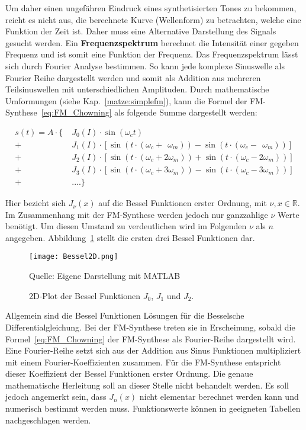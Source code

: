 Um daher einen ungefähren Eindruck eines synthetisierten Tones zu bekommen, reicht es nicht aus, die berechnete Kurve (Wellenform) zu betrachten, welche eine Funktion der Zeit ist. Daher muss eine Alternative Darstellung des Signals gesucht werden. Ein \textbf{Frequenzspektrum} berechnet die Intensität einer gegeben Frequenz und ist somit eine Funktion der Frequenz. Das Frequenzspektrum lässt sich durch Fourier Analyse bestimmen. So kann jede komplexe Sinuswelle als Fourier Reihe dargestellt werden und somit als Addition aus mehreren Teilsinuswellen mit unterschiedlichen Amplituden. \cite[S. 33]{raichel} Durch mathematische Umformungen (siehe Kap.~\ref{matze:simplefm}), kann die Formel der FM-Synthese~\ref{eq:FM_Chowning} als folgende Summe dargestellt werden: \cite{chowningPaper}

\begin{equation}
\begin{split}
s(t)=A\cdot \{\; & J_0(I)\cdot\sin(\omega_c t)  \\
         +&J_1(I)\cdot [\sin(t\cdot (\omega_c + \;\,\omega_m))-\sin(t\cdot (\omega_c-\;\,\omega_m))] \\
         +&J_2(I)\cdot [\sin(t\cdot (\omega_c + 2\omega_m))+\sin(t\cdot (\omega_c-2\omega_m))] \\
         +&J_3(I)\cdot [\sin(t\cdot (\omega_c + 3\omega_m))-\sin(t\cdot (\omega_c-3\omega_m))] \\
         +&....\}
\end{split}
\label{eq:chowningAddition}
\end{equation}

Hier bezieht sich $J_\nu(x)$ auf die Bessel Funktionen erster Ordnung, mit $\nu,x \in \mathbb{R}$. \cite[S. 223]{temme} Im Zusammenhang mit der FM-Synthese werden jedoch nur ganzzahlige $\nu$ Werte benötigt. Um diesen Umstand zu verdeutlichen wird im Folgenden $\nu$ als $n$ angegeben. Abbildung~\ref{fig:bessel2D} stellt die ersten drei Bessel Funktionen dar.

\begin{figure} [ht]
\centering
  \texttt{[image: Bessel2D.png]}
\caption{2D-Plot der Bessel Funktionen $J_0$, $J_1$ und $J_2$.}
\label{fig:bessel2D}
Quelle: Eigene Darstellung mit MATLAB
\end{figure}

\FloatBarrier


Allgemein sind die Bessel Funktionen Lösungen für die Besselsche Differentialgleichung.\cite[S. 220]{temme} Bei der FM-Synthese treten sie in Erscheinung, sobald die Formel~\ref{eq:FM_Chowning} der FM-Synthese als Fourier-Reihe dargestellt wird. Eine Fourier-Reihe setzt sich aus der Addition aus Sinus Funktionen multipliziert mit einem Fourier-Koeffizienten zusammen. Für die FM-Synthese entspricht dieser Koeffizient der Bessel Funktionen erster Ordnung. \cite[S. 221]{lathi} Die genaue mathematische Herleitung soll an dieser Stelle nicht behandelt werden. Es soll jedoch angemerkt sein, dass $J_n(x)$ nicht elementar berechnet werden kann und numerisch bestimmt werden muss.\cite[S. 385]{abramowitz} Funktionswerte können in geeigneten Tabellen nachgeschlagen werden. \cite{davis}

